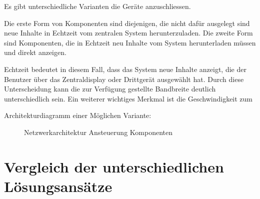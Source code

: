 Es gibt unterschiedliche Varianten die Geräte anzuschliessen.

Die erste Form von Komponenten sind diejenigen, die nicht dafür ausgelegt sind neue Inhalte in Echtzeit vom zentralen System herunterzuladen.
Die zweite Form sind Komponenten, die in Echtzeit neu Inhalte vom System herunterladen müssen und direkt anzeigen.

Echtzeit bedeutet in diesem Fall, dass das System neue Inhalte anzeigt, die der Benutzer über das Zentraldisplay oder Drittgerät ausgewählt hat.
Durch diese Unterscheidung kann die zur Verfügung gestellte Bandbreite deutlich unterschiedlich sein. 
Ein weiterer wichtiges Merkmal ist die Geschwindigkeit zum 


Architekturdiagramm einer Möglichen Variante:
\begin{figure}[hbt]
	\centering
	
	\caption[Netzwerkarchitektur Ansteuerung Komponenten]{Netzwerkarchitektur Ansteuerung Komponenten}
	\label{fig:architektur1}
\end{figure}
\section{Vergleich der unterschiedlichen Lösungsansätze}





